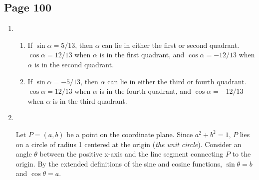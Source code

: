 \documentclass{article}
\newenvironment{solutions}[1]
{\subsection*{#1}
 \begin{enumerate}[leftmargin=1.5em]}
{\end{enumerate}}
\newcommand{\solution}{\item}
\newenvironment{subsolutions}
{\begin{enumerate}}
{\end{enumerate}}
\newcommand{\subsolution}{\item}
\begin{document}
\begin{solutions}{Page 100}
\begin{subsolutions}
\end{subsolutions}
\solution %
\begin{subsolutions}
\subsolution %
If $\sin{\alpha}=5/13$, then $\alpha$ can lie in either the first or second quadrant. $\cos{\alpha}=12/13$ when $\alpha$ is in the first quadrant, and $\cos{\alpha}=-12/13$ when $\alpha$ is in the second quadrant.

\subsolution %
If $\sin{\alpha}=-5/13$, then $\alpha$ can lie in either the third or fourth quadrant. $\cos{\alpha}=12/13$ when $\alpha$ is in the fourth quadrant, and $\cos{\alpha}=-12/13$ when $\alpha$ is in the third quadrant.

\end{subsolutions}

\solution ~ %
\begin{center}
\end{center}

Let $P = (a,b)$ be a point on the coordinate plane. Since $a^2+b^2=1$, $P$ lies on a circle of radius 1 centered at the origin (\textit{the unit circle}). Consider an angle $\theta$ between the positive x-axis and the line segment connecting $P$ to the origin. By the extended definitions of the sine and cosine functions, $\sin{\theta} = b$ and $\cos{\theta} = a$.
\end{solutions}
\end{document}
